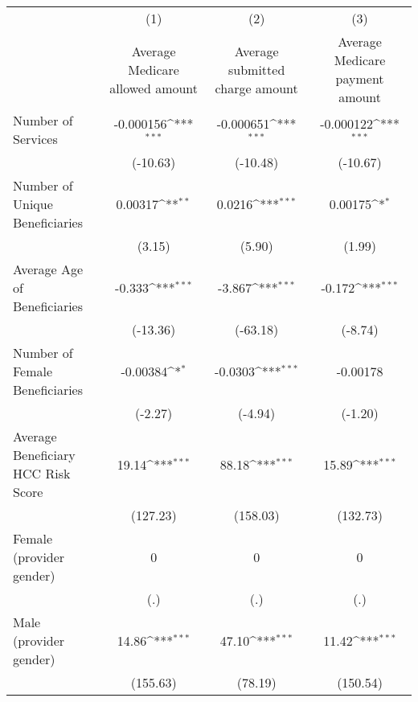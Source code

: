 \def\sym#1{\ifmmode^{#1}\else\(^{#1}\)\fi}
\begin{adjustbox}{max
width={\textwidth},caption={Average Cost per Healthcare Service over Time, by Provider\label{table:aggregate1}},nofloat=table}
\begin{tabular}{l*{3}{c}}
\toprule
                    &\multicolumn{1}{c}{(1)}&\multicolumn{1}{c}{(2)}&\multicolumn{1}{c}{(3)}\\
                    &\multicolumn{1}{c}{Average Medicare allowed amount}&\multicolumn{1}{c}{Average submitted charge amount}&\multicolumn{1}{c}{Average Medicare payment amount}\\
\midrule
Number of Services  &   -0.000156\sym{***}&   -0.000651\sym{***}&   -0.000122\sym{***}\\
                    &    (-10.63)         &    (-10.48)         &    (-10.67)         \\
\addlinespace
Number of Unique Beneficiaries&     0.00317\sym{**} &      0.0216\sym{***}&     0.00175\sym{*}  \\
                    &      (3.15)         &      (5.90)         &      (1.99)         \\
\addlinespace
Average Age of Beneficiaries&      -0.333\sym{***}&      -3.867\sym{***}&      -0.172\sym{***}\\
                    &    (-13.36)         &    (-63.18)         &     (-8.74)         \\
\addlinespace
Number of Female Beneficiaries&    -0.00384\sym{*}  &     -0.0303\sym{***}&    -0.00178         \\
                    &     (-2.27)         &     (-4.94)         &     (-1.20)         \\
\addlinespace
Average Beneficiary HCC Risk Score&       19.14\sym{***}&       88.18\sym{***}&       15.89\sym{***}\\
                    &    (127.23)         &    (158.03)         &    (132.73)         \\
\addlinespace
Female (provider gender)&           0         &           0         &           0         \\
                    &         (.)         &         (.)         &         (.)         \\
\addlinespace
Male (provider gender)&       14.86\sym{***}&       47.10\sym{***}&       11.42\sym{***}\\
                    &    (155.63)         &     (78.19)         &    (150.54)         \\

\end{tabular}
\end{adjustbox}
